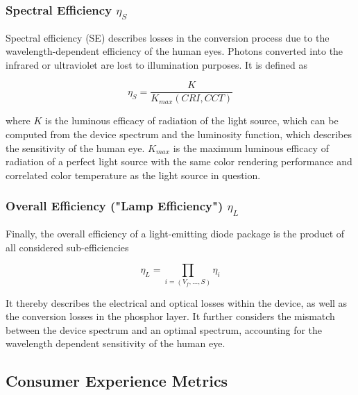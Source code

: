 \documentclass[twoside,twocolumn,9pt]{article}
\begin{document}
\subsubsection{Spectral Efficiency $\eta_{S}$}

Spectral efficiency (SE) describes losses in the conversion process due to the wavelength-dependent efficiency of the human eyes. Photons converted into the infrared or ultraviolet are lost to illumination purposes. It is defined as

\begin{equation}
    \eta_{S} = \frac{K}{K_{max}(CRI,CCT)}
\end{equation}

where $K$ is the luminous efficacy of radiation of the light source, which can be computed from the device spectrum and the luminosity function, which describes the sensitivity of the human eye. $K_{max}$ is the maximum luminous efficacy of radiation of a perfect light source with the same color rendering performance and correlated color temperature as the light source in question\cite{schubert2018light}\cite{tsao2010solid}.

\subsubsection{Overall Efficiency ("Lamp Efficiency") $\eta_L$}

Finally, the overall efficiency of a light-emitting diode package is the product of all considered sub-efficiencies

\begin{equation}
    \eta_L = \prod_{i=(V_f, \dots, S)} \eta_i
\end{equation}

It thereby describes the electrical and optical losses within the device, as well as the conversion losses in the phosphor layer. It further considers the mismatch between the device spectrum and an optimal spectrum, accounting for the wavelength dependent sensitivity of the human eye.

\subsection{Consumer Experience Metrics}
\end{document}
